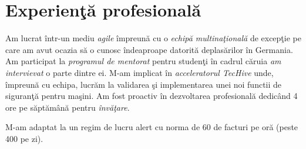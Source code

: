 %


\section{Experien\c{t}\u{a} profesional\u{a}}

{
\idea Am lucrat \^{i}ntr-un mediu \emph{agile} \^{i}mpreun\u{a} cu o \emph{echip\u{a} multina\c{t}ional\u{a}} de excep\c{t}ie pe care am avut ocazia s\u{a} o cunosc \^{i}ndeaproape datorit\u{a} deplas\u{a}rilor \^{i}n Germania.
\idea Am participat la \emph{programul de mentorat} pentru studen\c{t}i \^{i}n cadrul c\u{a}ruia \emph{am intervievat} o parte dintre ei.
\idea M-am implicat \^{i}n \emph{acceleratorul TecHive} unde, \^{i}mpreun\u{a} cu echipa, lucr\u{a}m la validarea \c{s}i implementarea unei noi functii de siguran\c{t}\u{a} pentru ma\c{s}ini.
\idea Am fost proactiv \^{i}n dezvoltarea profesional\u{a} dedic\^{a}nd 4 ore pe s\u{a}pt\u{a}m\^{a}n\u{a} pentru \emph{\^{i}nv\u{a}\c{t}are}.
}

{
\idea M-am adaptat la un regim de lucru alert cu norma de 60 de facturi pe or\u{a} (peste 400 pe zi).
}